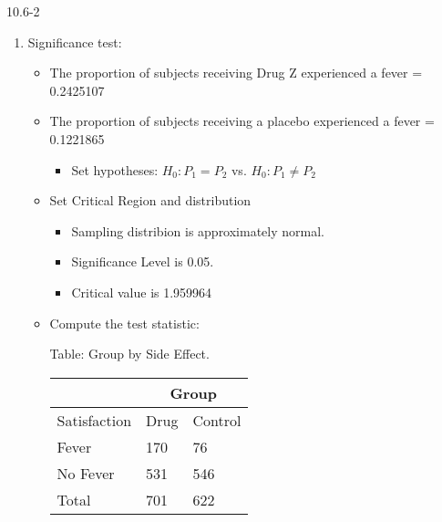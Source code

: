 \begin{exsol@solution}{10.6-2}

\par\nobreak\vspace{\baselineskip}

  \begin{enumerate}
	 \item Significance test:


\begin{itemize}

\item The proportion of subjects receiving Drug Z experienced a fever = 0.2425107
\item The proportion of subjects receiving a placebo experienced a fever = 0.1221865
  \begin{itemize}
  \item Set hypotheses: $H_0: P_1 = P_2$ vs. $H_0: P_1 \ne P_2$
  \end{itemize}

\item Set Critical Region and distribution

  \begin{itemize}
  \item Sampling distribion is approximately normal.
  \item Significance Level is 0.05.
  \item Critical value is 1.959964
  \end{itemize}

\item Compute the test statistic:

\begin{minipage}[h]{6cm}

Table: Group  by Side Effect.

      \begin{tabular}{@{} p{2.5cm} p{1cm} p{1cm} @{}} \hline %
     &  \multicolumn{2}{c}{Group } \\ \hline
     Satisfaction   & Drug & Control \\ \hline
     Fever             & 170 & 76 \\
     No Fever          & 531 & 546 \\ \hline
     Total             & 701 & 622 \\ \hline
   \end{tabular}


\end{minipage}
\end{itemize}
\end{enumerate}
\end{exsol@solution}
